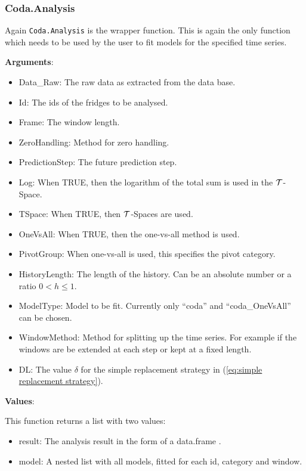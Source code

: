 \subsubsection{Coda.Analysis}
\label{sec:Coda.Analysis}

Again \texttt{Coda.Analysis} is the wrapper function. This is again the only function which needs to be used by the user to fit models for the specified time series.

\textbf{Arguments}:

\begin{itemize}
	\item Data\_Raw: The raw data as extracted from the data base.
	\item Id: The ids of the fridges to be analysed.
	\item Frame: The window length.
	\item ZeroHandling: Method for zero handling. 
	\item PredictionStep: The future prediction step. 
	\item Log: When TRUE, then the logarithm of the total sum is used in the $\mathcal{T}$-Space.
	\item TSpace: When TRUE, then $\mathcal{T}$-Spaces are used. 
	\item OneVsAll: When TRUE, then the one-vs-all method is used. 
	\item PivotGroup: When one-vs-all is used, this specifies the pivot category.
	\item HistoryLength: The length of the history. Can be an absolute number or a ratio $0<h\leq 1$. 
	\item ModelType: Model to be fit. Currently only "`coda"' and "`coda\_OneVsAll"' can be chosen.
	\item WindowMethod: Method for splitting up the time series. For example if the windows are be extended at each step or kept at a fixed length.
	\item DL: The value $\delta$ for the simple replacement strategy in (\ref{eq:simple replacement strategy}). 
\end{itemize}

\textbf{Values}:

This function returns a list with two values:

\begin{itemize}
	\item result: The analysis result in the form of a data.frame . 
	\item model: A nested list with all models, fitted for each id, category and window.
\end{itemize}



